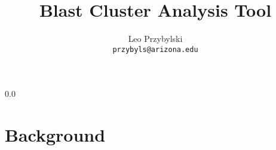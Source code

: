 \documentclass[11pt,notitlepage]{article}
\title{Blast Cluster Analysis Tool}
\author{Leo Przybylski\\
\texttt{przybyls@arizona.edu}}
\begin{document}
  \maketitle
  {\setlength{\baselineskip}%
           {0.0\baselineskip}
  \section*{\hfill Background}
  \hrulefill \par}
\end{document}
